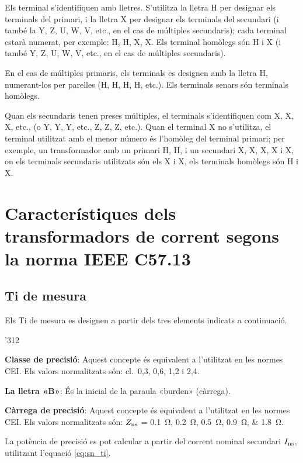 Els terminal s'identifiquen amb lletres. S'utilitza la lletra H per designar els terminals del primari, i la lletra X per designar els terminals del secundari (i també la Y, Z, U, W, V,  etc.{}, en el cas de múltiples secundaris); cada terminal estarà numerat, per exemple: H, H,  X, X. Els terminal homòlegs són H i X (i també Y, Z, U, W, V, etc.{}, en el cas de múltiples secundaris).

En el cas de múltiples primaris, els terminals es designen amb la lletra H, numerant-los per parelles (H, H, H, H, etc.{}). Els terminals senars són terminals homòlegs.

Quan els secundaris tenen preses múltiples, el terminals s'identifiquen com X, X, X, etc.{}, (o Y, Y, Y, etc.{}, Z, Z, Z, etc.{}). Quan el terminal X no s'utilitza, el terminal utilitzat amb el menor número és l'homòleg del terminal primari; per exemple, un transformador amb un primari H, H, i un secundari  X, X, X, X i X, on els terminals secundaris utilitzats són els X i  X, els terminals homòlegs són H i X.


\section{Característiques dels transformadors de corrent segons la norma IEEE C57.13}


\subsection{Ti de mesura}

Els Ti de mesura  es designen a partir
dels tres elements indicats a continuació.

\begin{dingautolist}{'312}
    \item \textbf{Classe de precisió}: Aquest concepte és equivalent
    a l'utilitzat en les normes CEI. Els valors
    normalitzats són: cl.~0,3, 0,6, 1,2 i 2,4.
    \item \textbf{La lletra «B»}: És la inicial de la paraula
    «burden»  (càrrega).
    \item \textbf{Càrrega de precisió}: Aquest concepte és equivalent
    a l'utilitzat en les normes CEI. Els valors
    normalitzats són: $Z_\mathrm{ns}$ = \SIlist{0,1;0,2;0,5;0,9;1,8}{\ohm}.

    La potència de precisió es pot calcular a partir del
    corrent  nominal secundari $I_\mathrm{ns}$, utilitzant l'equació
    \eqref{eq:sn_ti}.
\end{dingautolist}

